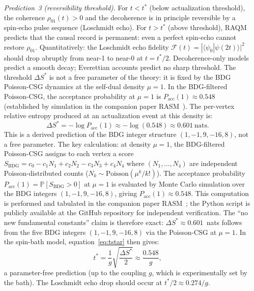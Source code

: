 \documentclass[11pt,a4paper]{article}
\theoremstyle{plain}
\theoremstyle{definition}
\theoremstyle{remark}
\begin{document}
\emph{Prediction~3 (reversibility threshold).} For $t < t^*$ (below actualization
threshold), the coherence $\rho_{01}(t) > 0$ and the decoherence is in principle
reversible by a spin-echo pulse sequence (Loschmidt echo). For $t > t^*$
(above threshold), RAQM predicts that the causal record is permanent: even a
perfect spin-echo cannot restore $\rho_{01}$. Quantitatively: the Loschmidt
echo fidelity $\mathcal{F}(t) = |\langle\psi_0|\psi(2t)\rangle|^2$ should
drop abruptly from near-1 to near-0 at $t = t^*/2$. Decoherence-only models
predict a smooth decay; Everettian accounts predict no sharp threshold.
The threshold $\Delta S^*$ is not a free parameter of the theory: it is
fixed by the BDG Poisson-CSG dynamics at the self-dual density $\mu = 1$.
In the BDG-filtered Poisson-CSG, the acceptance probability at $\mu = 1$ is
$P_{\mathrm{acc}}(1) \approx 0.548$ (established by simulation in
the companion paper RASM~\citep{Sandeman2026RASM}). The per-vertex
relative entropy produced at an actualization event at this density is:
\begin{equation}
  \Delta S^* = -\log P_{\mathrm{acc}}(1) \approx -\log(0.548)
  \approx 0.601~\text{nats}.
  \label{eq:Sstar}
\end{equation}
This is a derived prediction of the BDG integer structure $(1,-1,9,-16,8)$,
not a free parameter. The key calculation: at density $\mu = 1$, the
BDG-filtered Poisson-CSG assigns to each vertex a score
$S_{\mathrm{BDG}} = c_0 - c_1 N_1 + c_2 N_2 - c_3 N_3 + c_4 N_4$
where $(N_1,\ldots,N_4)$ are independent Poisson-distributed counts
($N_k \sim \mathrm{Poisson}(\mu^k/k!)$). The acceptance probability
$P_{\mathrm{acc}}(1) = \mathbb{P}[S_{\mathrm{BDG}} > 0]$ at $\mu=1$
is evaluated by Monte Carlo simulation over the BDG integers
$(1,-1,9,-16,8)$, giving $P_{\mathrm{acc}}(1) \approx 0.548$.
This computation is performed and tabulated in the companion paper
RASM~\citep{Sandeman2026RASM}; the Python script is publicly available
at the GitHub repository for independent verification.
The ``no new fundamental constants'' claim is therefore
exact: $\Delta S^* \approx 0.601$~nats follows from the five BDG integers
$(1,-1,9,-16,8)$ via the Poisson-CSG at $\mu = 1$.
In the spin-bath model, equation~\eqref{eq:tstar} then gives:
\begin{equation}
  t^* = \frac{1}{g}\sqrt{\frac{\Delta S^*}{2}}
  \approx \frac{0.548}{g},
  \label{eq:tstar_derived}
\end{equation}
a parameter-free prediction (up to the coupling $g$, which is experimentally
set by the bath). The Loschmidt echo drop should occur at
$t^*/2 \approx 0.274/g$.
\end{document}
